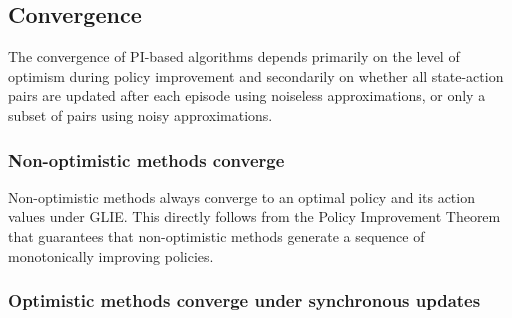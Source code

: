 
\subsection{Convergence}

The convergence of PI-based algorithms
depends primarily on the level of optimism during policy improvement and
secondarily on whether all state-action pairs are updated after each episode using noiseless approximations,
or only a subset of pairs using noisy approximations.



\subsubsection{Non-optimistic methods converge}

Non-optimistic methods always converge to an optimal policy and its action values under GLIE. This directly follows from the Policy Improvement Theorem that guarantees that non-optimistic methods generate a sequence of monotonically improving policies.

\subsubsection{Optimistic methods converge under synchronous updates}

